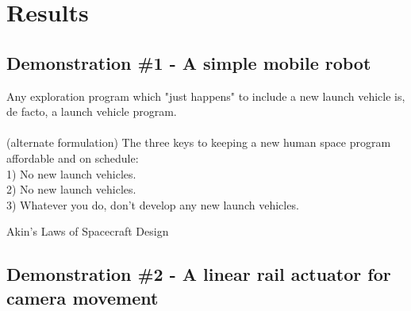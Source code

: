 \chapter{Results}
\label{ch:results}

\section{Demonstration \#1 - A simple mobile robot}
\label{sec:dem1}

\epigraph{
    Any exploration program which "just happens" to include a new launch vehicle is, de facto, a launch vehicle program. \\ \\
    (alternate formulation) The three keys to keeping a new human space program affordable and on schedule: \\
1)  No new launch vehicles. \\
2)  No new launch vehicles. \\
3)  Whatever you do, don't develop any new launch vehicles.}{Akin's Laws of Spacecraft Design\cite{phillip_koopman_better_2010}}

\section{Demonstration \#2 - A linear rail actuator for camera movement}
\label{sec:dem2}
